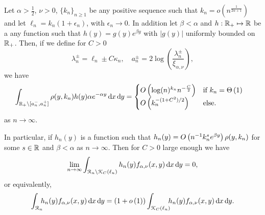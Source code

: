 \begin{lemma}\label{lem:concentration_argument}
Let $\alpha > \frac{1}{2}$, $\nu > 0$, $\{k_n\}_{n \ge 1}$ be any positive sequence such that $k_n = o(n^{\frac{1}{2\alpha + 1}})$ and let $\ell_n = k_n(1 + \epsilon_n)$, with $\epsilon_n \to 0$. In addition let $\beta < \alpha$ and $h : {\mathbb R}_+ \mapsto {\ensuremath{\mathbb R}}$ be a any function such that $h(y) = g(y)e^{\beta y}$ with $|g(y)|$ uniformly bounded on ${\mathbb R}_+$. Then, if we define for $C > 0$
\[
	\lambda_n^\pm = \ell_n \pm C \kappa_n, 
	\quad a_n^\pm = 2 \log\left(\frac{\lambda_n^\pm}{\xi_{\alpha,\nu}}\right),
\] 
we have
\begin{equation}\label{eq:error_bound_int_rho_not_K}
\begin{aligned}
	\int_{{\mathbb R}_+ \setminus [a_n^-, a_n^+]} \rho(y,k_n) h(y) \alpha e^{-\alpha y} \operatorname{\mathrm{d}\hspace{-2pt}} x \operatorname{\mathrm{d}\hspace{-2pt}} y
	&= \begin{cases}
		O\left(\log(n)^{k_n} n^{-\frac{C}{2}}\right) &\mbox{if } k_n = \Theta\left(1\right) \\
		O\left(k_n^{-(1+C^2)/2}\right) &\mbox{else.}
	\end{cases}
\end{aligned}
\end{equation}
as $n \to \infty$. 

In particular, if $h_n(y)$ is a function such that $h_n(y) = O\left(n^{-1} k_n^{s} e^{\beta y}\right)\rho(y,k_n)$ for some $s \in {\ensuremath{\mathbb R}}$ and $\beta < \alpha$ as $n \to \infty$. Then for $C > 0$ large enough we have
\[
	\lim_{n \to \infty} \int_{{\mathcal R}_n \setminus {\mathcal K}_{C}(\ell_n)} h_n(y) f_{\alpha,\nu}(x,y) \operatorname{\mathrm{d}\hspace{-2pt}} x\operatorname{\mathrm{d}\hspace{-2pt}} y = 0,
\]
or equivalently,
\[
	\int_{{\mathcal R}_n} \hspace{-5pt} h_n(y) f_{\alpha,\nu}(x,y) \operatorname{\mathrm{d}\hspace{-2pt}} x \operatorname{\mathrm{d}\hspace{-2pt}} y
	= (1+o\left(1\right)) \int_{{\mathcal K}_{C}(\ell_n)} \hspace{-5pt} h_n(y) f_{\alpha,\nu}(x,y) \operatorname{\mathrm{d}\hspace{-2pt}} x \operatorname{\mathrm{d}\hspace{-2pt}} y.
\]
\end{lemma}


